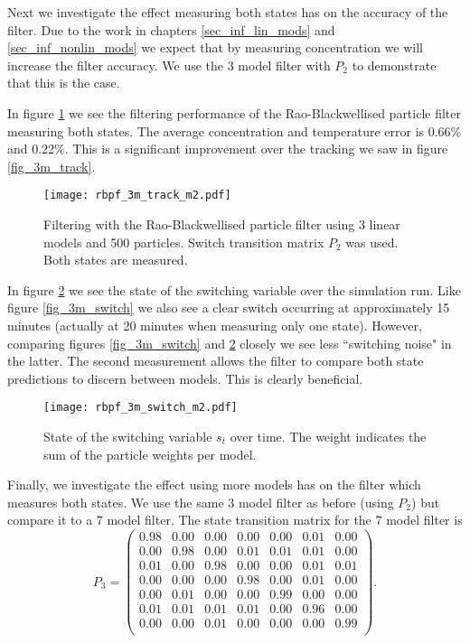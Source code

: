 Next we investigate the effect measuring both states has on the accuracy of the filter. Due to the work in chapters \ref{sec_inf_lin_mods} and \ref{sec_inf_nonlin_mods} we expect that by measuring concentration we will increase the filter accuracy. We use the 3 model filter with $P_2$ to demonstrate that this is the case.

In figure \ref{fig_3m_track_m2} we see the filtering performance of the Rao-Blackwellised particle filter measuring both states. The average concentration and temperature error is 0.66\% and 0.22\%. This is a significant improvement over the tracking we saw in figure \ref{fig_3m_track}.
\begin{figure}[H] 
\centering
\texttt{[image: rbpf\_3m\_track\_m2.pdf]}
\caption{Filtering with the Rao-Blackwellised particle filter using 3 linear models and 500 particles. Switch transition matrix $P_2$ was used. Both states are measured.}
\label{fig_3m_track_m2}
\end{figure}
In figure \ref{fig_3m_switch_m2} we see the state of the switching variable over the simulation run. Like figure \ref{fig_3m_switch} we also see a clear switch occurring at approximately 15 minutes (actually at 20 minutes when measuring only one state). However, comparing figures \ref{fig_3m_switch} and \ref{fig_3m_switch_m2} closely we see less ``switching noise" in the latter. The second measurement allows the filter to compare both state predictions to discern between models. This is clearly beneficial.
\begin{figure}[H] 
\centering
\texttt{[image: rbpf\_3m\_switch\_m2.pdf]}
\caption{State of the switching variable $s_t$ over time. The weight indicates the sum of the particle weights per model.}
\label{fig_3m_switch_m2}
\end{figure}
Finally, we investigate the effect using more models has on the filter which measures both states. We use the same 3 model filter as before (using $P_2$) but compare it to a 7 model filter. The state transition matrix for the 7 model filter is
\begin{equation}
P_3 = \begin{pmatrix}
0.98 & 0.00 & 0.00 & 0.00 & 0.00 & 0.01 & 0.00 \\
0.00 & 0.98 & 0.00 & 0.01 & 0.01 & 0.01 & 0.00 \\
0.01 & 0.00 & 0.98 & 0.00 & 0.00 & 0.01 & 0.01 \\
0.00 & 0.00 & 0.00 & 0.98 & 0.00 & 0.01 & 0.00 \\
0.00 & 0.01 & 0.00 & 0.00 & 0.99 & 0.00 & 0.00 \\
0.01 & 0.01 & 0.01 & 0.01 & 0.00 & 0.96 & 0.00 \\
0.00 & 0.00 & 0.01 & 0.00 & 0.00 & 0.00 & 0.99 \\
\end{pmatrix}.
\label{eq_state_trans7}
\end{equation}
